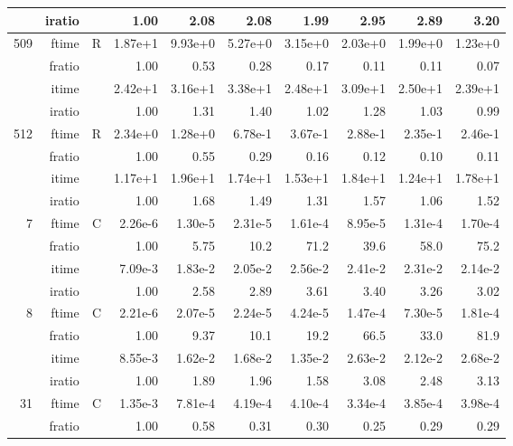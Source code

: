 \documentclass[a4paper]{article}
\begin{document}
\begin{table}
\begin{center}
\begin{tabular}{|r|r|r|r|r|r|r|r|r|r|}
     & iratio & &      1.00 &   2.08 &   2.08 &   1.99 &   2.95 &   2.89 &   3.20      \\ \hline 
  509  & ftime & R  &  1.87e+1 &   9.93e+0 &   5.27e+0 &   3.15e+0 &   2.03e+0 &   1.99e+0 &   1.23e+0    \\ 
      & fratio & &     1.00 &   0.53 &   0.28 &   0.17 &   0.11 &   0.11 &   0.07        \\ 
     & itime & &       2.42e+1 &   3.16e+1 &   3.38e+1 &   2.48e+1 &   3.09e+1 &   2.50e+1 &   2.39e+1       \\ 
     & iratio & &      1.00 &   1.31 &   1.40 &   1.02 &   1.28 &   1.03 &   0.99         \\ \hline 
  512  & ftime & R  &  2.34e+0 &   1.28e+0 &   6.78e-1 &   3.67e-1 &   2.88e-1 &   2.35e-1 &   2.46e-1     \\ 
      & fratio & &     1.00 &   0.55 &   0.29 &   0.16 &   0.12 &   0.10 &   0.11     \\ 
     & itime & &       1.17e+1 &   1.96e+1 &   1.74e+1 &   1.53e+1 &   1.84e+1 &   1.24e+1 &   1.78e+1        \\ 
     & iratio & &      1.00 &   1.68 &   1.49 &   1.31 &   1.57 &   1.06 &   1.52        \\ \hline \hline
    7  & ftime & C  &  2.26e-6 &   1.30e-5 &   2.31e-5 &   1.61e-4 &   8.95e-5 &   1.31e-4 &   1.70e-4    \\ 
      & fratio & &     1.00 &   5.75 &   10.2 &   71.2 &   39.6 &   58.0 &   75.2     \\ 
     & itime & &       7.09e-3 &   1.83e-2 &   2.05e-2 &   2.56e-2 &   2.41e-2 &   2.31e-2 &   2.14e-2      \\ 
     & iratio & &      1.00 &   2.58 &   2.89 &   3.61 &   3.40 &   3.26 &   3.02        \\ \hline 
    8  & ftime & C  &  2.21e-6 &   2.07e-5 &   2.24e-5 &   4.24e-5 &   1.47e-4 &   7.30e-5 &   1.81e-4      \\ 
      & fratio & &     1.00 &   9.37 &   10.1 &   19.2 &   66.5 &   33.0 &   81.9      \\ 
     & itime & &       8.55e-3 &   1.62e-2 &   1.68e-2 &   1.35e-2 &   2.63e-2 &   2.12e-2 &   2.68e-2       \\ 
     & iratio & &      1.00 &   1.89 &   1.96 &   1.58 &   3.08 &   2.48 &   3.13        \\ \hline 
   31  & ftime & C  &  1.35e-3 &   7.81e-4 &   4.19e-4 &   4.10e-4 &   3.34e-4 &   3.85e-4 &   3.98e-4     \\ 
      & fratio & &     1.00 &   0.58 &   0.31 &   0.30 &   0.25 &   0.29 &   0.29      \\ 

\end{tabular}
\end{center}
\end{table}
\end{document}
